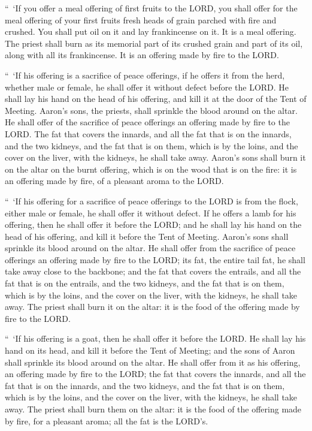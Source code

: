 \myverse{}“ ‘If you offer a meal offering of first fruits to the LORD, you
shall offer for the meal offering of your first fruits fresh heads of grain parched with fire and crushed.
\myverse{}You shall put oil on it and lay frankincense on it. It is a meal offering.
\myverse{}The priest shall burn as its memorial part of its crushed grain and part of
its oil, along with all its frankincense. It is an offering made by fire to the LORD.


\mychapter{} \myverse*{}“ ‘If his offering is a sacrifice of peace offerings, if he offers
it from the herd, whether male or female, he shall offer it without defect before the LORD.
\myverse{}He shall lay his hand on the head of his offering, and kill it at the door of
the Tent of Meeting. Aaron’s sons, the priests, shall sprinkle the blood around on the altar.
\myverse{}He shall offer of the sacrifice of peace offerings an offering made by fire
to the LORD. The fat that covers the innards, and all the fat that is on the innards,
\myverse{}and the two kidneys, and the fat that is on them, which is by the loins, and
the cover on the liver, with the kidneys, he shall take away.
\myverse{}Aaron’s sons shall burn it on the altar on the burnt offering, which is on the
wood that is on the fire: it is an offering made by fire, of a pleasant aroma to the LORD.


\myverse{}“ ‘If his offering for a sacrifice of peace offerings to the LORD
is from the flock, either male or female, he shall offer it without defect.
\myverse{}If he offers a lamb for his offering, then he shall offer it before the LORD;
\myverse{}and he shall lay his hand on the head of his offering, and kill it before the
Tent of Meeting. Aaron’s sons shall sprinkle its blood around on the altar.
\myverse{}He shall offer from the sacrifice of peace offerings an offering made by fire
to the LORD; its fat, the entire tail fat, he shall take away close to the backbone; and the fat that
covers the entrails, and all the fat that is on the entrails,
\myverse{}and the two kidneys, and the fat that is on them, which is by the loins, and
the cover on the liver, with the kidneys, he shall take away.
\myverse{}The priest shall burn it on the altar: it is the food of the offering made
by fire to the LORD.


\myverse{}“ ‘If his offering is a goat, then he shall offer it before the
LORD.
\myverse{}He shall lay his hand on its head, and kill it before the Tent of Meeting;
and the sons of Aaron shall sprinkle its blood around on the altar.
\myverse{}He shall offer from it as his offering, an offering made by fire to the LORD;
the fat that covers the innards, and all the fat that is on the innards,
\myverse{}and the two kidneys, and the fat that is on them, which is by the loins, and
the cover on the liver, with the kidneys, he shall take away.
\myverse{}The priest shall burn them on the altar: it is the food of the offering made
by fire, for a pleasant aroma; all the fat is the LORD’s.


